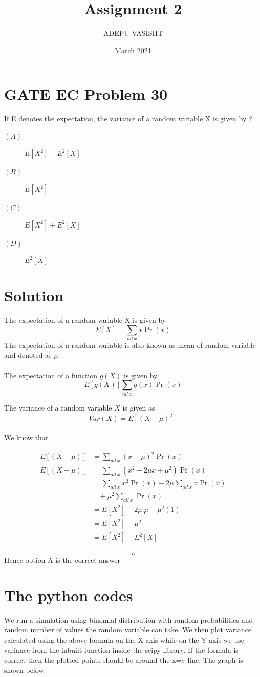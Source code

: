 \documentclass[journal,12pt,twocolumn]{IEEEtran}
\title{Assignment 2}
\author{ADEPU VASISHT}
\date{March 2021}
\providecommand{\brak}[1]{\ensuremath{\left(#1\right)}}
\begin{document}
\maketitle

\section*{GATE EC Problem 30}
If E denotes the expectation, the variance of a random variable X is given by ?

\begin{description}
\item[$\brak{A}$]$E[X^2]-E^2[X]$ 
\item[$\brak{B}$]$E[X^2]$
\item[$\brak{C}$]$E[X^2]+E^2[X]$ 
\item[$\brak{D}$]$E^2[X]$
\end{description}
\section*{Solution}
The expectation of a random variable X is given by $$E[X]=\sum_{all \ x}x\Pr\brak{x}$$
The expectation of a random variable is also known as mean of random variable and denoted as $\mu$\\\\
The expectation of a function $g\brak{X}$ is given by $$E[g\brak{X}]\sum_{all \ x}g\brak{x}\Pr\brak{x}$$

The variance of a random variable $X$ is given as $$Var\brak{X}=E[\brak{X-\mu}^2]$$

We know that



\begin{align}
    E[\brak{X-\mu}] &= \sum_{all \ x} \brak{x-\mu}^2 \Pr\brak{x}\\
    E[\brak{X-\mu}] &= \sum_{all \ x} \brak{x^2-2\mu x+\mu^2} \Pr\brak{x}\\ 
    &= \sum_{all \ x}x^2\Pr\brak{x}-2\mu\sum_{all\ x}x\Pr\brak{x}\\\nonumber & \   \ \ \ +\mu^2\sum_{all\ x}\Pr\brak{x}\\    
    &= E[X^2]-2\mu.\mu+\mu^2\brak{1}\\
    &= E[X^2]-\mu^2\\
    &= E[X^2]-E^2[X]
\end{align}

$$\therefore$$ Hence option A is the correct answer

\section*{The python codes}
We run a simulation using binomial distribution with random probabilities and random number of values the random variable can take. We then plot variance calculated using the above formula on the X-axis while on the Y-axis we use variance from the inbuilt function inside the scipy library. If the formula is correct then the plotted points should be around the x=y line. The graph is shown below.
\end{document}

